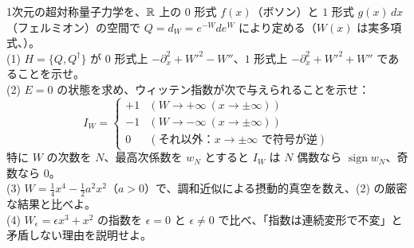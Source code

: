\begin{problem}[難易度 B]\label{ch11-prob-W}
1次元の超対称量子力学を、$\mathbb{R}$ 上の $0$ 形式 $f(x)$（ボソン）と $1$ 形式 $g(x)\,dx$（フェルミオン）の空間で $Q=d_W=e^{-W}de^{W}$ により定める（$W(x)$ は実多項式、）。\\
(1) $H=\{Q,Q^\dagger\}$ が $0$ 形式上 $-\partial_x^2+W'^2-W''$、$1$ 形式上 $-\partial_x^2+W'^2+W''$ であることを示せ。\\
(2) $E=0$ の状態を求め、ウィッテン指数が次で与えられることを示せ：
\[
I_W=\begin{cases}+1&(W\to+\infty\ (x\to\pm\infty))\\-1&(W\to-\infty\ (x\to\pm\infty))\\0&(\text{それ以外：}x\to\pm\infty\text{ で符号が逆})\end{cases}
\]
特に $W$ の次数を $N$、最高次係数を $w_N$ とすると $I_W$ は $N$ 偶数なら $\operatorname{sign}w_N$、奇数なら $0$。\\
(3) $W=\tfrac14x^4-\tfrac12a^2x^2$（$a>0$）で、調和近似による摂動的真空を数え、(2) の厳密な結果と比べよ。\\
(4) $W_\epsilon=\epsilon x^3+x^2$ の指数を $\epsilon=0$ と $\epsilon\neq0$ で比べ、「指数は連続変形で不変」と矛盾しない理由を説明せよ。
\end{problem}

